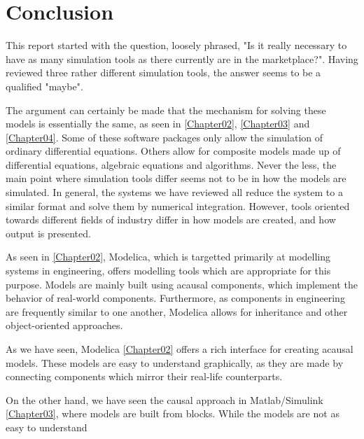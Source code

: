 \documentclass[\rootfolder/main.tex]{subfiles}
\begin{document}
\chapter{Conclusion} %

\label{Chapter06} %

This report started with the question, loosely phrased, "Is it really necessary to have as many simulation tools as there currently are in the marketplace?".
Having reviewed three rather different simulation tools, the answer seems to be a qualified "maybe".

The argument can certainly be made that the mechanism for solving these models is essentially the same, as seen in \ref{Chapter02}, \ref{Chapter03} and \ref{Chapter04}.
Some of these software packages only allow the simulation of ordinary differential equations.
Others allow for composite models made up of differential equations, algebraic equations and algorithms.
Never the less, the main point where simulation tools differ seems not to be in how the models are simulated.
In general, the systems we have reviewed all reduce the system to a similar format and solve them by numerical integration.
However, tools oriented towards different fields of industry differ in how models are created, and how output is presented.

As seen in \ref{Chapter02}, Modelica, which is targetted primarily at modelling systems in engineering, offers modelling tools which are appropriate for this purpose.
Models are mainly built using acausal components, which implement the behavior of real-world components.
Furthermore, as components in engineering are frequently similar to one another, Modelica allows for inheritance and other object-oriented approaches.

As we have seen, Modelica \ref{Chapter02} offers a rich interface for creating acausal models.
These models are easy to understand graphically, as they are made by connecting components which mirror their real-life counterparts.

On the other hand, we have seen the causal approach in Matlab/Simulink \ref{Chapter03}, where models are built from blocks.
While the models are not as easy to understand 
\end{document}
